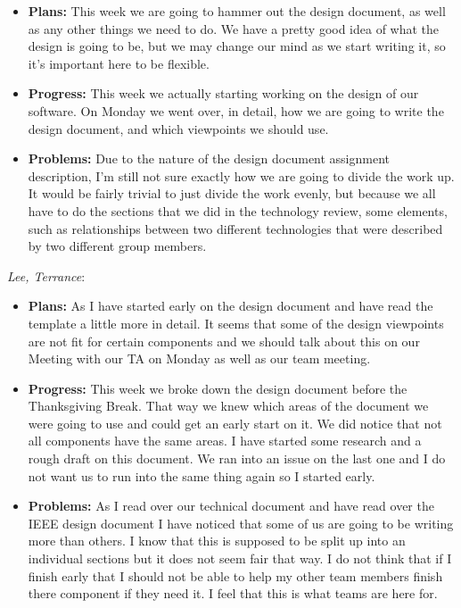 \documentclass[10pt,draftclsnofoot,onecolumn]{IEEEtran}
\newcommand{\subsubsubsection}[1]{
	\hfill\break\textit{#1}:
}
\begin{document}
\begin{itemize}
	\item \textbf{Plans: }
	This week we are going to hammer out the design document, as well as any other things we need to do. We have a pretty good idea of what the design is going to be, but we may change our mind as we start writing it, so it's important here to be flexible.
	\item \textbf{Progress: }
	This week we actually starting working on the design of our software. On Monday we went over, in detail, how we are going to write the design document, and which viewpoints we should use.
	\item \textbf{Problems: }
	Due to the nature of the design document assignment description, I'm still not sure exactly how we are going to divide the work up. It would be fairly trivial to just divide the work evenly, but because we all have to do the sections that we did in the technology review, some elements, such as relationships between two different technologies that were described by two different group members.
\end{itemize}
\subsubsubsection{Lee, Terrance}
\begin{itemize}
	\item \textbf{Plans: }As I have started early on the design document and have read the template a little more in detail. It seems that some of the design viewpoints are not fit for certain components and we should talk about this on our Meeting with our TA on Monday as well as our team meeting.
	\item \textbf{Progress: }This week we broke down the design document before the Thanksgiving Break. That way we knew which areas of the document we were going to use and could get an early start on it. We did notice that not all components have the same areas. I have started some research and a rough draft on this document. We ran into an issue on the last one and I do not want us to run into the same thing again so I started early.
	\item \textbf{Problems: }As I read over our technical document and have read over the IEEE design document I have noticed that some of us are going to be writing more than others. I know that this is supposed to be split up into an individual sections but it does not seem fair that way. I do not think that if I finish early that I should not be able to help my other team members finish there component if they need it. I feel that this is what teams are here for.
\end{itemize}
\end{document}
